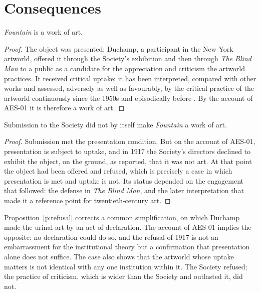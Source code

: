 \documentclass{situationist-preprint}
\begin{document}
\section{Consequences}

\begin{proposition}\label{p:art}
\emph{Fountain} is a work of art.
\end{proposition}

\begin{proof}
The object was presented: Duchamp, a participant in the New York artworld, offered it through the Society's exhibition and then through \emph{The Blind Man} to a public as a candidate for the appreciation and criticism the artworld practices. It received critical uptake: it has been interpreted, compared with other works and assessed, adversely as well as favourably, by the critical practice of the artworld continuously since the 1950s and episodically before \citep{deDuve1996}. By the account of AES-01 it is therefore a work of art.
\end{proof}

\begin{proposition}\label{p:refusal}
Submission to the Society did not by itself make \emph{Fountain} a work of art.
\end{proposition}

\begin{proof}
Submission met the presentation condition. But on the account of AES-01, presentation is subject to uptake, and in 1917 the Society's directors declined to exhibit the object, on the ground, as reported, that it was not art. At that point the object had been offered and refused, which is precisely a case in which presentation is met and uptake is not. Its status depended on the engagement that followed: the defense in \emph{The Blind Man}, and the later interpretation that made it a reference point for twentieth-century art.
\end{proof}

Proposition~\ref{p:refusal} corrects a common simplification, on which Duchamp made the urinal art by an act of declaration. The account of AES-01 implies the opposite: no declaration could do so, and the refusal of 1917 is not an embarrassment for the institutional theory but a confirmation that presentation alone does not suffice. The case also shows that the artworld whose uptake matters is not identical with any one institution within it. The Society refused; the practice of criticism, which is wider than the Society and outlasted it, did not.
\end{document}
